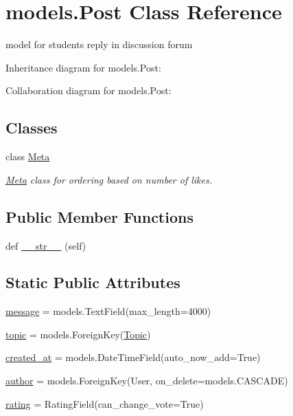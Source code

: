 \hypertarget{classmodels_1_1_post}{}\section{models.\+Post Class Reference}
\label{classmodels_1_1_post}


model for student\textquotesingle{}s reply in discussion forum  




Inheritance diagram for models.\+Post\+:


Collaboration diagram for models.\+Post\+:
\subsection*{Classes}
\begin{DoxyCompactItemize}
\item 
class \hyperlink{classmodels_1_1_post_1_1_meta}{Meta}
\begin{DoxyCompactList}\small\item\em \hyperlink{classmodels_1_1_post_1_1_meta}{Meta} class for ordering based on number of likes. \end{DoxyCompactList}\end{DoxyCompactItemize}
\subsection*{Public Member Functions}
\begin{DoxyCompactItemize}
\item 
def \hyperlink{classmodels_1_1_post_aafdd083965c5d3782b716df6499db352}{\+\_\+\+\_\+str\+\_\+\+\_\+} (self)
\end{DoxyCompactItemize}
\subsection*{Static Public Attributes}
\begin{DoxyCompactItemize}
\item 
\hyperlink{classmodels_1_1_post_ad66c792a53f3c3e39cac8e7c2efec323}{message} = models.\+Text\+Field(max\+\_\+length=4000)
\item 
\hyperlink{classmodels_1_1_post_a8b375c00f4324d267ef2ad27cf603c8c}{topic} = models.\+Foreign\+Key(\hyperlink{classmodels_1_1_topic}{Topic})
\item 
\hyperlink{classmodels_1_1_post_a81a26a5f331115ff024de5ae2d18f9a9}{created\+\_\+at} = models.\+Date\+Time\+Field(auto\+\_\+now\+\_\+add=True)
\item 
\hyperlink{classmodels_1_1_post_a71bda3ed7d25e7ab89839a1bd8f35e8d}{author} = models.\+Foreign\+Key(User, on\+\_\+delete=models.\+C\+A\+S\+C\+A\+DE)
\item 
\hyperlink{classmodels_1_1_post_ade8df96ef07130fe7304225c1d1f326d}{rating} = Rating\+Field(can\+\_\+change\+\_\+vote=True)
\end{DoxyCompactItemize}


